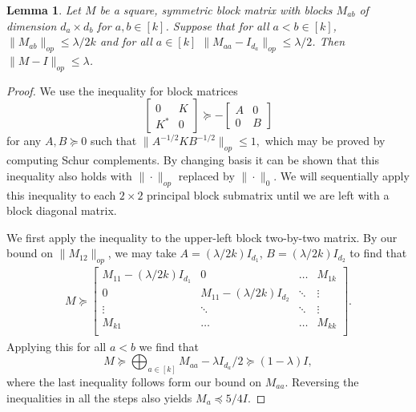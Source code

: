 \documentclass[aos]{imsart}
\newtheorem{lemma}[theorem]{Lemma}
\theoremstyle{definition}
\newcommand{\rv}{X}
\begin{document}
\begin{lemma}\label{lem:block-matrix}
Let $M$ be a square, symmetric block matrix with blocks $M_{ab}$ of dimension $d_a \times d_b$ for $a,b \in [k]$. Suppose that for all $a < b \in [k]$, $\|M_{ab}\|_{op} \leq \lambda/2k$ and for all $a \in [k]$ $\|M_{aa} - I_{d_a}\|_{op} \leq \lambda/2$. Then $\|M - I\|_{op} \leq \lambda$.%
\end{lemma}
\begin{proof}
We use the inequality for block matrices
$$\begin{bmatrix} 0 & K \\ K^{*} & 0 \end{bmatrix} \succeq - \begin{bmatrix} A & 0 \\ 0 & B \end{bmatrix}$$ for any $A,B \succeq 0$ such that $\|A^{-1/2} K B^{-1/2}\|_{op} \leq 1,$ which may be proved by computing Schur complements. By changing basis it can be shown that this inequality also holds with $\| \cdot \|_{op}$ replaced by $\|\cdot\|_0$. We will sequentially apply this inequality to each $2\times 2$ principal block submatrix until we are left with a block diagonal matrix. 

We first apply the inequality to the upper-left block two-by-two matrix. By our bound on $\|M_{12}\|_{op}$, we may take
   $A = (\lambda/2k) I_{d_1}$, $B = (\lambda/2k) I_{d_2}$ to find that
   \begin{align*}
M \succeq \begin{bmatrix}
M_{11}-  (\lambda/2k) I_{d_1} & 0 & \hdots &  M_{1k} \\
0 & M_{11} - (\lambda/2k) I_{d_2} & \ddots & \vdots \\
\vdots & \ddots & \ddots & \vdots\\
M_{k1} & \hdots &  \hdots & M_{kk}\\
  \end{bmatrix}.\end{align*}
 Applying this for all $a < b$ we find that
 $$M \succeq \bigoplus_{a \in [k]} M_{aa} -  \lambda I_{d_a}/2 \succeq (1 -\lambda) I, $$
 where the last inequality follows form our bound on $M_{aa}.$ Reversing the inequalities in all the steps also yields $M_a \preceq 5/4 I$. \end{proof}
\end{document}
